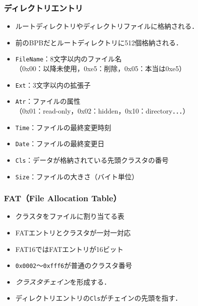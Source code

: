 \documentclass[unicode,handout]{beamer}                   %
\begin{document}
\begin{frame}
  \frametitle{ディレクトリエントリ}
  \begin{itemize}
  \item ルートディレクトリやディレクトリファイルに格納される．
  \item 前のBPBだとルートディレクトリに512個格納される．
  \item \texttt{FileName}：8文字以内のファイル名\\
    （0x00：以降未使用，0xe5：削除，0x05：本当は0xe5）
  \item \texttt{Ext}：3文字以内の拡張子
  \item \texttt{Atr}：ファイルの属性\\
    （0x01：read-only，0x02：hidden，0x10：directory．．．）
  \item \texttt{Time}：ファイルの最終変更時刻
  \item \texttt{Date}：ファイルの最終変更日
  \item \texttt{Cls}：データが格納されている先頭クラスタの番号
  \item \texttt{Size}：ファイルの大きさ（バイト単位）
  \end{itemize}
\end{frame}

\begin{frame}
  \frametitle{FAT（File Allocation Table）}
  \vfill
  \begin{itemize}
  \item クラスタをファイルに割り当てる表
  \item FATエントリとクラスタが一対一対応
  \item FAT16ではFATエントリが16ビット
  \item \texttt{0x0002}〜\texttt{0xfff6}が普通のクラスタ番号
  \item \emph{クラスタチェイン}を形成する．
  \item ディレクトリエントリの\texttt{Cls}がチェインの先頭を指す．
  \end{itemize}
\end{frame}
\end{document}
